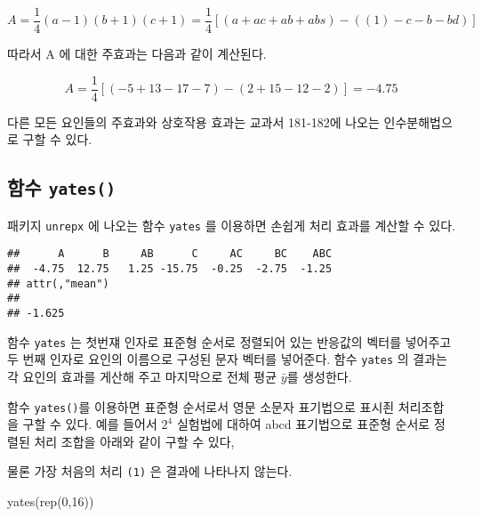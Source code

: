 \documentclass[
]{book}
\newenvironment{Shaded}{\begin{snugshade}}{\end{snugshade}}
\newcommand{\DecValTok}[1]{\textcolor[rgb]{0.00,0.00,0.81}{#1}}
\newcommand{\FunctionTok}[1]{\textcolor[rgb]{0.00,0.00,0.00}{#1}}
\newcommand{\NormalTok}[1]{#1}
\newcommand{\SpecialCharTok}[1]{\textcolor[rgb]{0.00,0.00,0.00}{#1}}
\newcommand{\StringTok}[1]{\textcolor[rgb]{0.31,0.60,0.02}{#1}}
\begin{document}
\[ A = \frac{1}{4} (a-1)(b+1)(c+1) = \frac{1}{4} [(a + ac + ab + abs) - ((1)-c-b-bd)] \]

따라서 A 에 대한 주효과는 다음과 같이 계산된다.

\[ A = \frac{1}{4} [(-5+13-17-7)-(2 +15-12-2)] = -4.75 \]

다른 모든 요인들의 주효과와 상호작용 효과는 교과서 181-182에 나오는 인수분해법으로 구할 수 있다.

\hypertarget{uxd568uxc218-yates}{%
\subsection{\texorpdfstring{함수 \texttt{yates()}}{함수 yates()}}\label{uxd568uxc218-yates}}

패키지 \texttt{unrepx} 에 나오는 함수 \texttt{yates} 를 이용하면 손쉽게 처리 효과를 계산할 수 있다.

\begin{Shaded}
\end{Shaded}

\begin{verbatim}
##      A      B     AB      C     AC     BC    ABC 
##  -4.75  12.75   1.25 -15.75  -0.25  -2.75  -1.25 
## attr(,"mean")
##        
## -1.625
\end{verbatim}

함수 \texttt{yates} 는 첫번쟤 인자로 표준형 순서로 정렬되어 있는 반응값의 벡터를 넣어주고 두 번째 인자로 요인의 이름으로 구성된 문자 벡터를 넣어준다. 함수 \texttt{yates} 의 결과는 각 요인의 효과를 게산해 주고 마지막으로 전체 평균 \(\bar y\)를 생성한다.

함수 \texttt{yates()}를 이용하면 표준형 순서로서 영문 소문자 표기법으로 표시죈 처리조합을 구할 수 있다.
예를 들어서 \(2^4\) 실험법에 대하여 abcd 표기법으로 표준형 순서로 정렬된 처리 조합을 아래와 같이 구할 수 있다,

물론 가장 처음의 처리 \texttt{(1)} 은 결과에 나타나지 않는다.

\begin{Shaded}
\begin{Highlighting}[]
\FunctionTok{yates}\NormalTok{(}\FunctionTok{rep}\NormalTok{(}\DecValTok{0}\NormalTok{,}\DecValTok{16}\NormalTok{))}
\end{Highlighting}
\end{Shaded}
\end{document}
